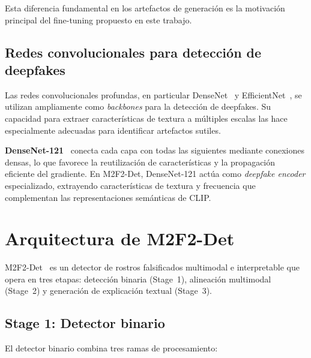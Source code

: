 \documentclass[pdflatex,sn-mathphys-num]{sn-jnl}
\begin{document}
Esta diferencia fundamental en los artefactos de generación es la motivación principal del fine-tuning propuesto en este trabajo.

\subsection{Redes convolucionales para detección de deepfakes}\label{subsec:cnn}

Las redes convolucionales profundas, en particular DenseNet~\cite{huang2017densenet} y EfficientNet~\cite{tan2019efficientnet}, se utilizan ampliamente como \emph{backbones} para la detección de deepfakes. Su capacidad para extraer características de textura a múltiples escalas las hace especialmente adecuadas para identificar artefactos sutiles.

\textbf{DenseNet-121}~\cite{huang2017densenet} conecta cada capa con todas las siguientes mediante conexiones densas, lo que favorece la reutilización de características y la propagación eficiente del gradiente. En M2F2-Det, DenseNet-121 actúa como \emph{deepfake encoder} especializado, extrayendo características de textura y frecuencia que complementan las representaciones semánticas de CLIP.



\section{Arquitectura de M2F2-Det}\label{sec:architecture}

M2F2-Det~\cite{guo2025m2f2det} es un detector de rostros falsificados multimodal e interpretable que opera en tres etapas: detección binaria (Stage~1), alineación multimodal (Stage~2) y generación de explicación textual (Stage~3).

\subsection{Stage 1: Detector binario}\label{subsec:stage1}

El detector binario combina tres ramas de procesamiento:
\end{document}
